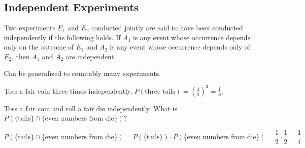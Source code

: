 \subsection{Independent Experiments}
\begin{definition}
    Two experiments $E_1$ and $E_2$ conducted jointly are said to have been
conducted independently if the following holds. If $A_1$ is any event whose
occurrence depends only on the outcome of $E_1$ and $A_2$ is any event whose
occurrence depends only of $E_2$, then $A_1$ and $A_2$ are independent.
\end{definition}
Can be generalized to countably many experiments.

\begin{example}
    Toss a fair coin three times independently. $P(\text{three tails}) =
(\frac{1}{2})^3 = \frac{1}{8}$.
\end{example}

\begin{example}
    Toss a fair coin and roll a fair die independently. What is
$P(\lbrace \text{tails} \rbrace \cap \lbrace \text{even numbers from
die} \rbrace)$?
\end{example}
\begin{solution}
    \begin{equation*}
        P(\lbrace \text{tails} \rbrace \cap \lbrace \text{even numbers from
          die} \rbrace)
        = P(\lbrace \text{tails} \rbrace) \cdot
          P(\lbrace \text{even numbers from die} \rbrace)
        = \frac{1}{2} \cdot \frac{1}{2}
        = \frac{1}{4}
    \end{equation*}
\end{solution}

